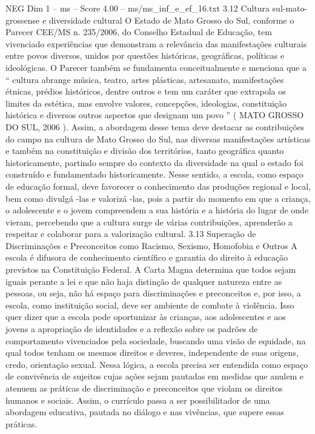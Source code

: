 \begin{textsample}{NEG Dim 1 – ms – Score 4.00 – ms/ms\_inf\_e\_ef\_16.txt}  \label{ex:f1_neg_104}
3.12 Cultura sul-mato-grossense e diversidade cultural O Estado de Mato Grosso do Sul, conforme o Parecer CEE/MS n. 235/2006, do Conselho Estadual de Educação, tem vivenciado experiências que demonstram a relevância das manifestações culturais entre povos diversos, unidos por questões históricas, geográficas, políticas e ideológicas.
O Parecer também se fundamenta conceitualmente e menciona que a “ cultura abrange música, teatro, artes plásticas, artesanato, manifestações étnicas, prédios históricos, dentre outros e tem um caráter que extrapola os limites da estética, mas envolve valores, concepções, ideologias, constituição histórica e diversos outros aspectos que designam um povo ” ( MATO GROSSO DO SUL, 2006 ).
Assim, a abordagem desse tema deve destacar as contribuições do campo na cultura de Mato Grosso do Sul, nas diversas manifestações artísticas e também na constituição e divisão dos territórios, tanto geográfica quanto historicamente, partindo sempre do contexto da diversidade na qual o estado foi construído e fundamentado historicamente.
Nesse sentido, a escola, como espaço de educação formal, deve favorecer o conhecimento das produções regional e local, bem como divulgá -las e valorizá -las, pois a partir do momento em que a criança, o adolescente e o jovem compreendem a sua história e a história do lugar de onde vieram, percebendo que a cultura surge de várias contribuições, aprenderão a respeitar e colaborar para a valorização cultural. 3.13 Superação de Discriminações e Preconceitos como Racismo, Sexismo, Homofobia e Outros A escola é difusora de conhecimento científico e garantia do direito à educação previstos na Constituição Federal.
A Carta Magna determina que todos sejam iguais perante a lei e que não haja distinção de qualquer natureza entre as pessoas, ou seja, não há espaço para discriminações e preconceitos e, por isso, a escola, como instituição social, deve ser ambiente de combate à violência.
Isso quer dizer que a escola pode oportunizar às crianças, aos adolescentes e aos jovens a apropriação de identidades e a reflexão sobre os padrões de comportamento vivenciados pela sociedade, buscando uma visão de equidade, na qual todos tenham os mesmos direitos e deveres, independente de suas origens, credo, orientação sexual.
Nessa lógica, a escola precisa ser entendida como espaço de convivência de sujeitos cujas ações sejam pautadas em medidas que anulem e atenuem as práticas de discriminação e preconceitos que violam os direitos humanos e sociais.
Assim, o currículo passa a ser possibilitador de uma abordagem educativa, pautada no diálogo e nas vivências, que supere essas práticas.

\end{textsample}
